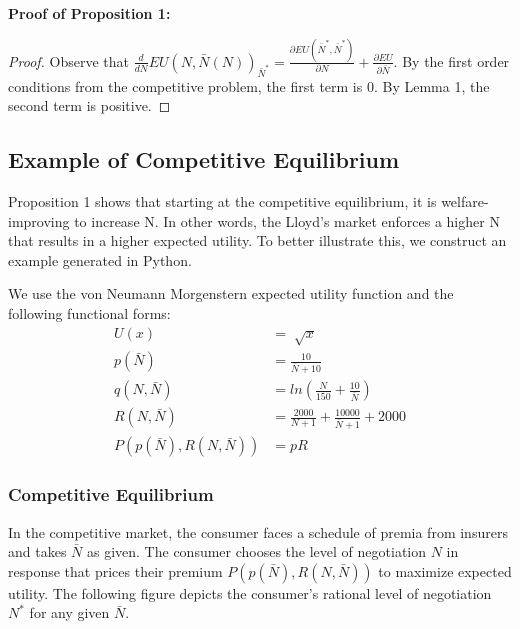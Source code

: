 \documentclass[12pt]{article}
\theoremstyle{plain}
\begin{document}
\noindent
\textbf{Proof of Proposition 1:}

\begin{proof}
Observe that $\frac{d}{dN}EU(N,\bar{N}(N))_{\bar{N}^*} = \frac{\partial EU(\bar{N}^*, \bar{N}^*)}{\partial N} + \frac{\partial EU}{\partial \bar{N}}$. By the first order conditions from the competitive problem, the first term is 0. By Lemma 1, the second term is positive. 
\end{proof}

\subsection{Example of Competitive Equilibrium}

Proposition 1 shows that starting at the competitive equilibrium, it is welfare-improving to increase N. In other words, the Lloyd's market enforces a higher N that results in a higher expected utility. To better illustrate this, we construct an example generated in Python.

We use the von Neumann Morgenstern expected utility function and the following functional forms:
\begin{align*}
U(x) &= \sqrt[]{x} \\
p(\bar{N}) &= \frac{10}{\bar{N} + 10} \\
q(N, \bar{N}) &= ln(\frac{N}{150} + \frac{10}{\bar{N}}) \\
R(N, \bar{N}) &= \frac{2000}{N + 1} + \frac{10000}{\bar{N} + 1} + 2000 \\
P(p(\bar{N}), R(N,\bar{N})) &= pR 
\end{align*}

\subsubsection{Competitive Equilibrium}

In the competitive market, the consumer faces a schedule of premia from insurers and takes $\bar{N}$ as given. The consumer chooses the level of negotiation $N$ in response that prices their premium $P(p(\bar{N}), R(N,\bar{N}))$ to maximize expected utility. The following figure depicts the consumer's rational level of negotiation $N^*$ for any given $\bar{N}$.
\end{document}
